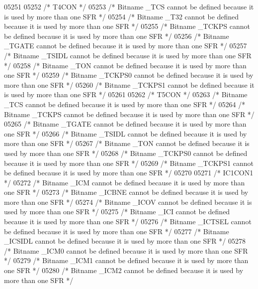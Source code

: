 \begin{DoxyCode}
05251 
05252 \textcolor{comment}{/* T4CON */}
05253 \textcolor{comment}{/* Bitname \_TCS cannot be defined because it is used by more than one SFR */}
05254 \textcolor{comment}{/* Bitname \_T32 cannot be defined because it is used by more than one SFR */}
05255 \textcolor{comment}{/* Bitname \_TCKPS cannot be defined because it is used by more than one SFR */}
05256 \textcolor{comment}{/* Bitname \_TGATE cannot be defined because it is used by more than one SFR */}
05257 \textcolor{comment}{/* Bitname \_TSIDL cannot be defined because it is used by more than one SFR */}
05258 \textcolor{comment}{/* Bitname \_TON cannot be defined because it is used by more than one SFR */}
05259 \textcolor{comment}{/* Bitname \_TCKPS0 cannot be defined because it is used by more than one SFR */}
05260 \textcolor{comment}{/* Bitname \_TCKPS1 cannot be defined because it is used by more than one SFR */}
05261 
05262 \textcolor{comment}{/* T5CON */}
05263 \textcolor{comment}{/* Bitname \_TCS cannot be defined because it is used by more than one SFR */}
05264 \textcolor{comment}{/* Bitname \_TCKPS cannot be defined because it is used by more than one SFR */}
05265 \textcolor{comment}{/* Bitname \_TGATE cannot be defined because it is used by more than one SFR */}
05266 \textcolor{comment}{/* Bitname \_TSIDL cannot be defined because it is used by more than one SFR */}
05267 \textcolor{comment}{/* Bitname \_TON cannot be defined because it is used by more than one SFR */}
05268 \textcolor{comment}{/* Bitname \_TCKPS0 cannot be defined because it is used by more than one SFR */}
05269 \textcolor{comment}{/* Bitname \_TCKPS1 cannot be defined because it is used by more than one SFR */}
05270 
05271 \textcolor{comment}{/* IC1CON1 */}
05272 \textcolor{comment}{/* Bitname \_ICM cannot be defined because it is used by more than one SFR */}
05273 \textcolor{comment}{/* Bitname \_ICBNE cannot be defined because it is used by more than one SFR */}
05274 \textcolor{comment}{/* Bitname \_ICOV cannot be defined because it is used by more than one SFR */}
05275 \textcolor{comment}{/* Bitname \_ICI cannot be defined because it is used by more than one SFR */}
05276 \textcolor{comment}{/* Bitname \_ICTSEL cannot be defined because it is used by more than one SFR */}
05277 \textcolor{comment}{/* Bitname \_ICSIDL cannot be defined because it is used by more than one SFR */}
05278 \textcolor{comment}{/* Bitname \_ICM0 cannot be defined because it is used by more than one SFR */}
05279 \textcolor{comment}{/* Bitname \_ICM1 cannot be defined because it is used by more than one SFR */}
05280 \textcolor{comment}{/* Bitname \_ICM2 cannot be defined because it is used by more than one SFR */}

\end{DoxyCode}
